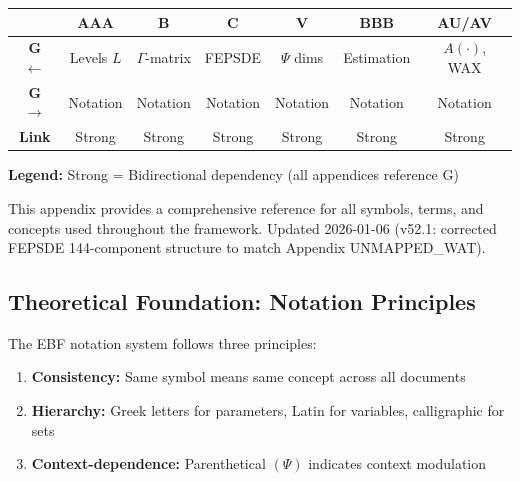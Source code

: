 
\begin{tcolorbox}[colback=white, colframe=black,
    title=\textbf{Cross-Reference Map}]

\begin{center}
\small
\begin{tabular}{@{}c|cccccc@{}}
\toprule
& \textbf{AAA} & \textbf{B} & \textbf{C} & \textbf{V} & \textbf{BBB} & \textbf{AU/AV} \\
\midrule
\textbf{G $\leftarrow$} & Levels $L$ & $\Gamma$-matrix & FEPSDE & $\Psi$ dims & Estimation & $A(\cdot)$, WAX \\
\textbf{G $\rightarrow$} & Notation & Notation & Notation & Notation & Notation & Notation \\
\midrule
\textbf{Link} & \cellcolor{red!20}Strong & \cellcolor{red!20}Strong & \cellcolor{red!20}Strong & \cellcolor{red!20}Strong & \cellcolor{red!20}Strong & \cellcolor{red!20}Strong \\
\bottomrule
\end{tabular}
\end{center}

\textbf{Legend:}
\colorbox{red!20}{Strong} = Bidirectional dependency (all appendices reference G)

\end{tcolorbox}

This appendix provides a comprehensive reference for all symbols, terms, and concepts used throughout the framework. Updated 2026-01-06 (v52.1: corrected FEPSDE 144-component structure to match Appendix UNMAPPED_WAT).

\subsection{Theoretical Foundation: Notation Principles}
\label{sec:glossary-theory}

The EBF notation system follows three principles:

\begin{enumerate}
    \item \textbf{Consistency:} Same symbol means same concept across all documents
    \item \textbf{Hierarchy:} Greek letters for parameters, Latin for variables, calligraphic for sets
    \item \textbf{Context-dependence:} Parenthetical $(\Psi)$ indicates context modulation
\end{enumerate}

